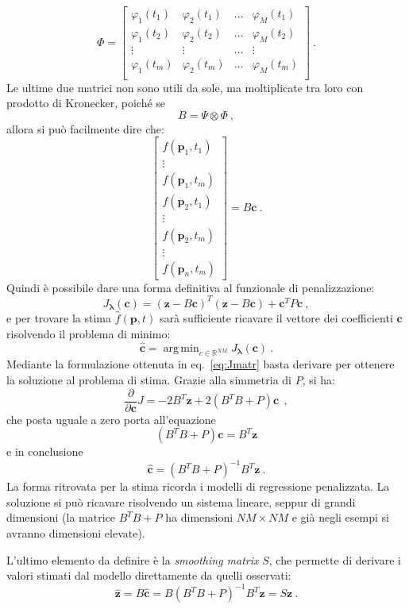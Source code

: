 \documentclass[a4paper,11pt,twoside,openright]{book}							%
\DeclareMathOperator*{\argmin}{arg\,min}
\begin{document}
$$
\Phi = 
\begin{bmatrix}
\varphi_{1}( t_1) & \varphi_{2}( t_1) & \hdots & \varphi_{M}( t_1)  \\
\varphi_{1}( t_2) & \varphi_{2}( t_2) & \hdots & \varphi_{M}( t_2)  \\
\vdots & \vdots & \hdots & \vdots \\
\varphi_{1}( t_m) & \varphi_{2}( t_m) & \hdots & \varphi_{M}( t_m)  \\
\end{bmatrix} \ .
$$
Le ultime due matrici non sono utili da sole, ma moltiplicate tra loro con prodotto di Kronecker, poiché se
$$ B = \Psi \otimes \Phi \ ,$$
allora si può facilmente dire che:
$$
\begin{bmatrix}
f(\bm p_1,t_1)  \\
\vdots\\
f(\bm p_1,t_m)  \\
f(\bm p_2,t_1)  \\
\vdots\\
f(\bm p_2,t_m)  \\
\vdots\\
f(\bm p_n,t_m)
\end{bmatrix}= B \bm c \ .
$$
Quindi è possibile dare una forma definitiva al funzionale di penalizzazione:
\begin{equation} 
\label{eq:Jmatr}
J_{\bm \lambda }(\bm c) = (\bm z - B \bm c)^T (\bm z - B \bm c) + \bm c^T P \bm c \ ,
\end{equation}
e per trovare la stima $\hat{f}(\bm{p},t)$ sarà sufficiente ricavare il vettore dei coefficienti $\bm c$ risolvendo il problema di minimo:
$$
\hat{\bm{c}}=\argmin_{c \in \mathbb{R}^{NM}} J_{\bm \lambda }(\bm c) \ .
$$
Mediante la formulazione ottenuta in eq.~\ref{eq:Jmatr} basta derivare per ottenere la soluzione al problema di stima. Grazie alla simmetria di $P$, si ha:
$$
\frac{\partial}{\partial \bm c}J= -2 B^T \bm z + 2(B^T B + P) \bm c \ \ ,
$$
che posta uguale a zero porta all'equazione
$$
(B^T B + P) \bm c = B^T\bm z
$$ 
e in conclusione
\begin{equation}
\label{eq:sysnocovar}
\hat  {\bm c} = (B^T B + P)^{-1}B^T \bm z \ .
\end{equation} 
La forma ritrovata per la stima ricorda i modelli di regressione penalizzata. La soluzione si può ricavare risolvendo un sistema lineare, seppur di grandi dimensioni (la matrice $B^T B + P$ ha dimensioni $NM \times NM$ e già negli esempi si avranno dimensioni elevate).

L'ultimo elemento da definire è la \textit{smoothing matrix} $S$, che permette di derivare i valori stimati dal modello direttamente da quelli osservati:
$$
\hat  {\bm z} =B\hat  {\bm c} = B(B^T B + P)^{-1}B^T \bm z = S\bm{z} \ .
$$
\end{document}
